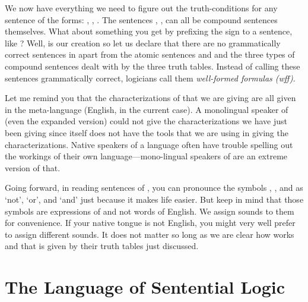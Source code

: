 We now have everything we need to figure out the truth-conditions for any 
sentence of the forms: , , .  
The sentences , ,  can all be compound sentences themselves.  
What about something you get by prefixing the \p{\land} sign to a sentence, like 
? Well, \lL[S]{} is our creation so let us declare that there are 
no grammatically correct sentences in \lL[S]{} apart from the atomic sentences 
 and  and the three types of compound sentences dealt with by the 
three truth tables. Instead of calling these sentences grammatically correct,
logicians call them  \emph{well-formed formulas (wff)}.

Let me remind you that the characterizations of \lL[S]{} that we are giving are all 
given in the meta-language (English, in the current case). A monolingual speaker 
of \lL[S]{} (even the expanded version) could not give the characterizations we have 
just been giving since \lL[S]{} itself does not have the tools that we are using 
in giving the characterizations. Native speakers of a language often have 
trouble spelling out the workings of their own language---mono-lingual speakers 
of \lL[S]{} are an extreme version of that.

Going forward, in reading sentences of \lL[S]{}, you can pronounce  the symbols 
\p{\lnot}, \p{\lor}, and \p{\land} as `not', `or', and `and' just because it 
makes life easier. But keep in mind that those symbols are expressions of \lL[S]{} 
and not words of English. We assign sounds to them for convenience. If your 
native tongue is not English, you might very well prefer to assign different 
sounds. It does not matter so long as we are clear how \lL[S]{} works and that is 
given by their truth tables just discussed.






\section{The Language of Sentential Logic}{\label{sec:sentential logic}}



